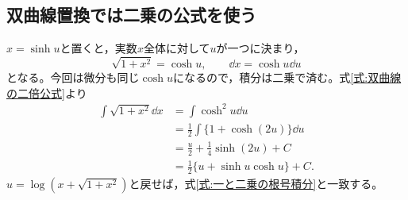 \subsection{双曲線置換では二乗の公式を使う}

$x=\sinh u$と置くと，実数$x$全体に対して$u$が一つに決まり，
\[
\sqrt{1+x^2}=\cosh u,\qquad
\dd x=\cosh u\dd u
\]
となる。今回は微分も同じ$\cosh u$になるので，積分は二乗で済む。式\eqref{式:双曲線の二倍公式}より
\[
\begin{aligned}
\int\sqrt{1+x^2}\dd x
&=\int\cosh^2u\dd u\\
&=\frac12\int\{1+\cosh(2u)\}\dd u\\
&=\frac u2+\frac14\sinh(2u)+C\\
&=\frac12\{u+\sinh u\cosh u\}+C.
\end{aligned}
\]
$u=\log(x+\sqrt{1+x^2})$と戻せば，式\eqref{式:一と二乗の根号積分}と一致する。

